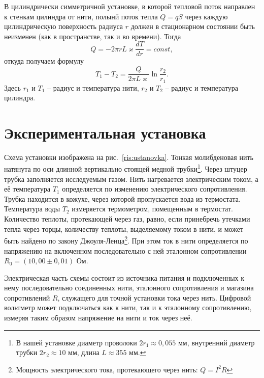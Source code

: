 \documentclass[a4paper,12pt]{article} %
\begin{document}
	В цилиндрически симметричной установке, в которой тепловой поток направлен к стенкам цилиндра от нити, полынй поток тепла $Q = qS$ через каждую цилиндрическую поверхность радиуса $r$ должен в стационарном состоянии быть неизменен (как в пространстве, так и во времени). Тогда
\begin{equation}
	Q = -2\pi rL\varkappa \frac{dT}{dr} = const,	
\end{equation}
откуда получаем формулу
\begin{equation}
	\label{formula}
	T_1 - T_2 = \frac{Q}{2\pi L\varkappa} \ln \frac{r_2}{r_1}.
\end{equation}
Здесь $r_1$ и $T_1$ -- радиус и температура нити, $r_2$ и $T_2$ -- радиус и температура цилиндра.


\section{Экспериментальная установка}

	Схема установки изображена на рис.~\ref{ris:ustanovka}. Тонкая молибденовая нить натянута по оси длинной вертикально стоящей медной трубки\footnote{В нашей установке диаметр проволоки $2r_1 \approx 0,055$ мм, внутренний диаметр трубки $2r_2 \approx 10$ мм, длина $L \approx 355$ мм.}.
	Через штуцер трубка заполняется исследуемым газом. Нить нагревается электрическим током, а её температура $T_1$ определяется по изменению электрического сопротивления. Трубка находится в кожухе, через которой пропускается вода из термостата. Температура воды $T_2$ измеряется термометром, помещенным в термостат. Количество теплоты, протекающей через газ, равно, если принебречь утечками тепла через торцы, количеству теплоты, выделяемому током в нити, и может быть найдено по закону Джоуля-Ленца\footnote{Мощность электрического тока, протекающего через нить: $Q = I^2 R$}. При этом ток в нити определяется по напряжению на включенном последовательно с ней эталонном сопротивлении $R_0 = (10,00 \pm 0,01)$ Ом.
	
	Электрическая часть схемы состоит из источника питания и подключенных к нему последовательно соединенных нити, эталонного сопротивления и магазина сопротивлений $R$, служащего для точной установки тока через нить. Цифровой вольтметр может подключаться как к нити, так и к эталонному сопротивлению, измеряя таким образом напряжение на нити и ток через неё.
	
\end{document}
